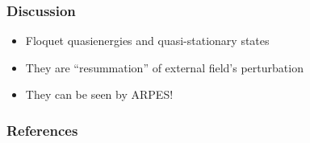 \documentclass[t]{beamer}
\begin{document}
\endgroup

\begin{frame}
\frametitle{Discussion}

\begin{itemize}
    \item Floquet quasienergies and quasi-stationary states 
    \item They are ``resummation'' of external field's perturbation
    \item They can be seen by ARPES!
\end{itemize}    

\end{frame}

\begin{frame}[allowframebreaks]
    \frametitle{References}

    \printbibliography

\end{frame}
\end{document}
